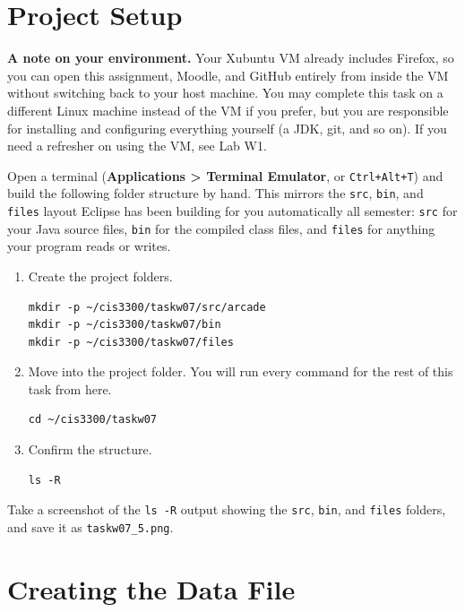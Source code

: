 \documentclass[11pt]{article}
\begin{document}
\ResourcesDisclaimer

\section{Project Setup}

\noindent\textbf{\color{coaNavy}A note on your environment.} Your Xubuntu VM
already includes Firefox, so you can open this assignment, Moodle, and GitHub
entirely from inside the VM without switching back to your host machine. You
may complete this task on a different Linux machine instead of the VM if you
prefer, but you are responsible for installing and configuring everything
yourself (a JDK, git, and so on). If you need a refresher on using the VM,
see Lab W1.

Open a terminal (\textbf{Applications > Terminal Emulator}, or
\texttt{Ctrl+Alt+T}) and build the following folder structure by hand. This
mirrors the \texttt{src}, \texttt{bin}, and \texttt{files} layout Eclipse has
been building for you automatically all semester: \texttt{src} for your Java
source files, \texttt{bin} for the compiled class files, and \texttt{files}
for anything your program reads or writes.

\begin{enumerate}[itemsep=2pt]
  \item Create the project folders.
\begin{lstlisting}[language={}]
mkdir -p ~/cis3300/taskw07/src/arcade
mkdir -p ~/cis3300/taskw07/bin
mkdir -p ~/cis3300/taskw07/files
\end{lstlisting}
  \item Move into the project folder. You will run every command for the
    rest of this task from here.
\begin{lstlisting}[language={}]
cd ~/cis3300/taskw07
\end{lstlisting}
  \item Confirm the structure.
\begin{lstlisting}[language={}]
ls -R
\end{lstlisting}
\end{enumerate}

Take a screenshot of the \texttt{ls -R} output showing the \texttt{src},
\texttt{bin}, and \texttt{files} folders, and save it as
\texttt{taskw07\_5.png}.

\section{Creating the Data File}
\end{document}
